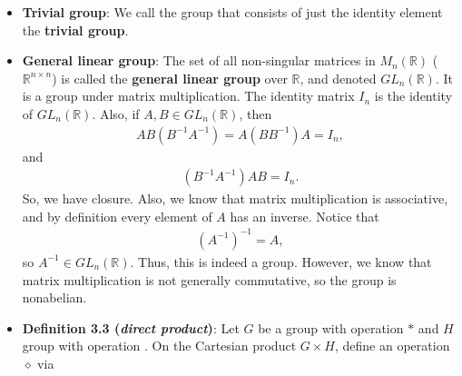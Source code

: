 \documentclass{report}
\begin{document}
\begin{itemize}
\begin{align*}
                (G, \cdot ) = (\left\{w \in \mathbb{C}:\; w^{n} = 1\right\}, \cdot)
            .\end{align*}
            If $w,z \in G$, then
            \begin{align*}
                (wz)^{n} = w^{n}z^{n} = 1(1) = 1
            .\end{align*}
            So, we have closure. Next, we know that multiplication is both associative and commutative, and $1 \in G$ is the identity. Now, for $w \in G$, $\frac{1}{w} \in \mathbb{C}$, and
            \begin{align*}
                \left(\frac{1}{w}\right)^{n} = \frac{1}{w^{n}} = \frac{1}{1} = 1
            .\end{align*}
            So, $\frac{1}{w} \in G$, and $\frac{1}{w} = w^{-1}$, since
            \begin{align*}
                w\left(\frac{1}{w}\right) = 1
            .\end{align*}
        \item \textbf{Trivial group}: We call the group that consists of just the identity element the \textbf{trivial group}.
        \item \textbf{General linear group}: The set of all non-singular matrices in $M_{n}(\mathbb{R})$ ($\mathbb{R}^{n\times n}$) is called the \textbf{general linear group} over $\mathbb{R}$, and denoted $GL_{n}(\mathbb{R}) $. It is a group under matrix multiplication. The identity matrix $I_{n}$ is the identity of $GL_{n}(\mathbb{R})$. Also, if $A,B \in GL_{n}(\mathbb{R})$,  then
            \begin{align*}
                AB(B^{-1}A^{-1}) = A(BB^{-1})A = I_{n}
            ,\end{align*}
            and
            \begin{align*}
                (B^{-1}A^{-1})AB = I_{n}
            .\end{align*}
            So, we have closure. Also, we know that matrix multiplication is associative, and by definition every element of $A$ has an inverse. Notice that
            \begin{align*}
                (A^{-1})^{-1} = A
            ,\end{align*}
            so $A^{-1} \in GL_{n}(\mathbb{R})$. Thus, this is indeed a group. However, we know that matrix multiplication is not generally commutative, so the group is nonabelian.
        \item \textbf{Definition 3.3 (\textit{direct product})}: Let $G$ be a group with operation $\ast$ and $H$ group with operation \bullet. On the Cartesian product $G\times H$, define an operation $\diamond$ via

\end{itemize}
\end{document}
